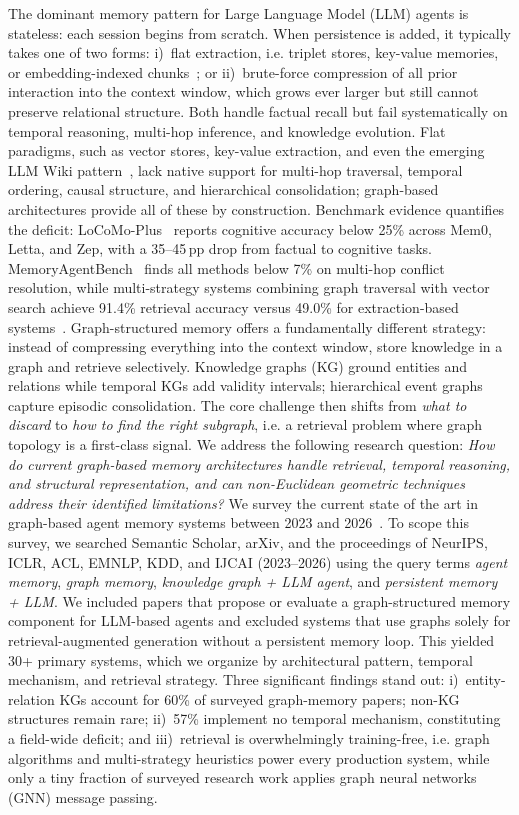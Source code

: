 \documentclass[hf]{ceurart}
\begin{document}
The dominant memory pattern for Large Language Model (LLM) agents is stateless: each session
begins from scratch. When persistence is added, it typically takes one
of two forms: i)~flat extraction, i.e. triplet stores, key-value memories,
or embedding-indexed chunks~\cite{mem0_2025,packer2023}; or
ii)~brute-force compression of all prior interaction into the context
window, which grows ever larger but still cannot preserve relational
structure. Both handle factual recall but fail systematically on
temporal reasoning, multi-hop inference, and knowledge evolution.
Flat paradigms, such as vector stores, key-value extraction, and even
the emerging LLM Wiki pattern~\cite{karpathyllmwiki2025}, lack
native support for multi-hop traversal, temporal ordering, causal
structure, and hierarchical consolidation; graph-based architectures
provide all of these by construction.
Benchmark evidence quantifies the deficit:
LoCoMo-Plus~\cite{gurawaliya2026} reports cognitive accuracy below 25\%
across Mem0, Letta, and Zep, with a 35--45\,pp drop from
factual to cognitive tasks. MemoryAgentBench~\cite{memoryagentbench2026}
finds all methods below 7\% on multi-hop conflict resolution, while multi-strategy systems combining graph traversal with vector search
achieve 91.4\% retrieval accuracy versus 49.0\% for extraction-based
systems~\cite{vectorize2026}. Graph-structured memory offers a fundamentally different
strategy: instead of compressing everything into the context window,
store knowledge in a graph and retrieve selectively. Knowledge graphs (KG)
ground entities and relations while temporal KGs add validity intervals;
hierarchical event graphs capture episodic consolidation. The core
challenge then shifts from \emph{what to discard} to \emph{how to
find the right subgraph}, i.e. a retrieval problem where graph topology is
a first-class signal.
We address the following research question: \emph{How do current
graph-based memory architectures handle retrieval, temporal reasoning,
and structural representation, and can non-Euclidean geometric
techniques address their identified limitations?}
We survey the current state of the art in graph-based agent memory
systems between 2023 and 2026~\cite{graphmemsurvey2026, memagents2026}.
To scope this survey, we searched Semantic Scholar, arXiv, and the
proceedings of NeurIPS, ICLR, ACL, EMNLP, KDD, and IJCAI (2023--2026)
using the query terms \emph{agent memory}, \emph{graph memory},
\emph{knowledge graph + LLM agent}, and \emph{persistent memory +
LLM}. We included papers that propose or evaluate a graph-structured
memory component for LLM-based agents and excluded systems that use
graphs solely for retrieval-augmented generation without a persistent
memory loop. This yielded 30+ primary systems, which we organize
by architectural pattern, temporal mechanism, and retrieval strategy.
Three significant findings stand out: i)~entity-relation KGs account for 60\% of surveyed graph-memory papers;
non-KG structures remain rare; ii)~57\% implement no temporal mechanism, constituting a field-wide deficit; and iii)~retrieval is overwhelmingly training-free, i.e. graph algorithms and
multi-strategy heuristics power every production system, while only a tiny fraction of surveyed research work applies graph neural networks (GNN) message passing.
\end{document}
